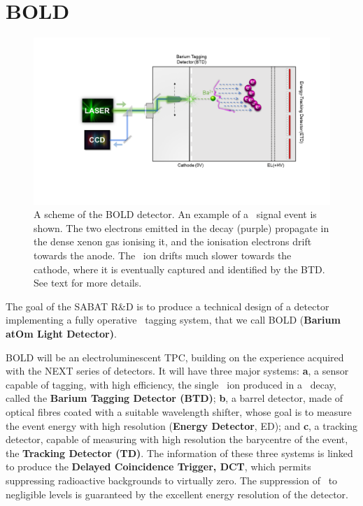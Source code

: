 \documentclass[a4paper,11pt]{article}
\begin{document}
\section{BOLD}

\begin{figure}[tbh!]
  \centering
   \includegraphics[scale=0.50]{Bold_v4.png}
   \vspace*{-3mm}
   \caption{A scheme of the BOLD detector. An example of a \bbonu\ signal event is shown. The two electrons emitted in the decay (purple) propagate in the dense xenon gas ionising it, and the ionisation electrons drift towards the anode. The \Bapp\ ion drifts much slower towards the cathode, where it is eventually captured and identified by the BTD. See text for more details.}
  \label{fig:nextbold}
\end{figure}

The goal of the SABAT R\&D is to produce a technical design of a 
detector implementing a fully operative \Bapp\ tagging system, that we call BOLD ({\bf Barium atOm Light Detector)}. 

BOLD will be an electroluminescent TPC, building on the experience acquired with the NEXT series of detectors. It will have three major systems: \textbf{a}, a sensor capable of tagging, with high efficiency, the single \Bapp\ ion produced in a \bbonu\ decay, called the {\bf Barium Tagging Detector (BTD)}; \textbf{b}, a barrel detector, made of optical fibres coated with a suitable wavelength shifter, whose goal is to measure the event energy with high resolution ({\bf Energy Detector}, ED); and \textbf{c}, a tracking detector, capable of measuring with high resolution the barycentre of the event, the {\bf Tracking Detector (TD)}. The information of these three systems is linked to produce the {\bf Delayed Coincidence Trigger, DCT}, which permits suppressing radioactive backgrounds to virtually zero. The suppression of \bbtnu\ to negligible levels is guaranteed by the excellent energy resolution of the detector. 
\end{document}
